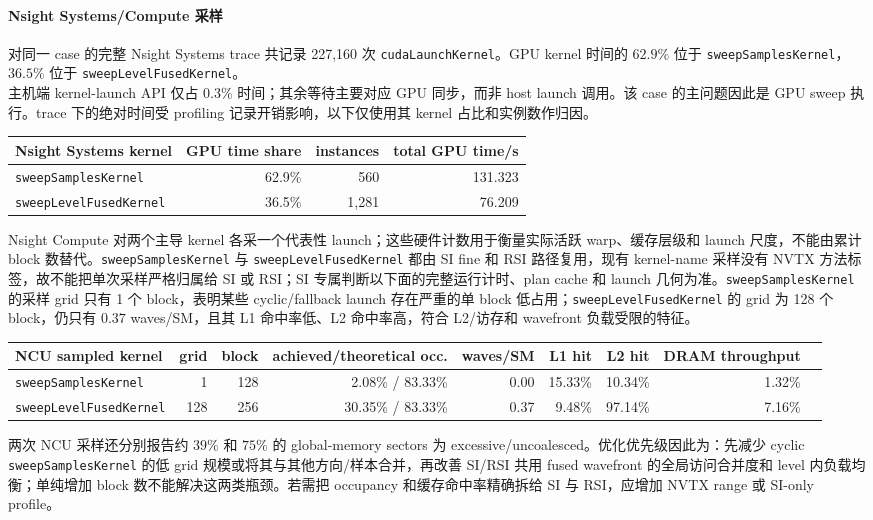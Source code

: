 \documentclass[10pt]{article}
\newcommand{\code}[1]{\texttt{#1}}
\begin{document}
\paragraph{Nsight Systems/Compute 采样}

对同一 case 的完整 Nsight Systems trace 共记录 227,160 次 \code{cudaLaunchKernel}。GPU kernel 时间的 $62.9\%$ 位于 \code{sweepSamplesKernel}，$36.5\%$ 位于 \code{sweepLevelFusedKernel}。\\
主机端 kernel-launch API 仅占 $0.3\%$ 时间；其余等待主要对应 GPU 同步，而非 host launch 调用。该 case 的主问题因此是 GPU sweep 执行。trace 下的绝对时间受 profiling 记录开销影响，以下仅使用其 kernel 占比和实例数作归因。

{\scriptsize\setlength{\tabcolsep}{3.3pt}
\begin{tabular}{lrrr}
\toprule
Nsight Systems kernel & GPU time share & instances & total GPU time/s\\
\midrule
\code{sweepSamplesKernel} & 62.9\% & 560 & 131.323\\
\code{sweepLevelFusedKernel} & 36.5\% & 1,281 & 76.209\\
\bottomrule
\end{tabular}}

Nsight Compute 对两个主导 kernel 各采一个代表性 launch；这些硬件计数用于衡量实际活跃 warp、缓存层级和 launch 尺度，不能由累计 block 数替代。\code{sweepSamplesKernel} 与 \code{sweepLevelFusedKernel} 都由 SI fine 和 RSI 路径复用，现有 kernel-name 采样没有 NVTX 方法标签，故不能把单次采样严格归属给 SI 或 RSI；SI 专属判断以下面的完整运行计时、plan cache 和 launch 几何为准。\code{sweepSamplesKernel} 的采样 grid 只有 1 个 block，表明某些 cyclic/fallback launch 存在严重的单 block 低占用；\code{sweepLevelFusedKernel} 的 grid 为 128 个 block，仍只有 $0.37$ waves/SM，且其 L1 命中率低、L2 命中率高，符合 L2/访存和 wavefront 负载受限的特征。

{\scriptsize\setlength{\tabcolsep}{2.8pt}
\begin{tabular}{lrrrrrrrr}
\toprule
NCU sampled kernel & grid & block & achieved/theoretical occ. & waves/SM & L1 hit & L2 hit & DRAM throughput\\
\midrule
\code{sweepSamplesKernel} & 1 & 128 & 2.08\% / 83.33\% & 0.00 & 15.33\% & 10.34\% & 1.32\%\\
\code{sweepLevelFusedKernel} & 128 & 256 & 30.35\% / 83.33\% & 0.37 & 9.48\% & 97.14\% & 7.16\%\\
\bottomrule
\end{tabular}}

两次 NCU 采样还分别报告约 $39\%$ 和 $75\%$ 的 global-memory sectors 为 excessive/uncoalesced。优化优先级因此为：先减少 cyclic \code{sweepSamplesKernel} 的低 grid 规模或将其与其他方向/样本合并，再改善 SI/RSI 共用 fused wavefront 的全局访问合并度和 level 内负载均衡；单纯增加 block 数不能解决这两类瓶颈。若需把 occupancy 和缓存命中率精确拆给 SI 与 RSI，应增加 NVTX range 或 SI-only profile。
\end{document}
